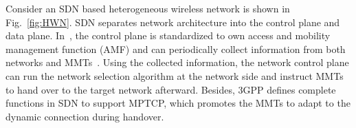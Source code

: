 \documentclass[conference]{IEEEtran}
\begin{document}
Consider an SDN based heterogeneous wireless network is shown in Fig.~\ref{fig:HWN}. SDN separates network architecture into the control plane and data plane.
In~\cite{3GPP}, the control plane is standardized to own access and mobility management function (AMF) and
can periodically collect information from both networks and MMTs~\cite{speedup}. Using the collected information, 
the network control plane can run the network selection algorithm at the network side and instruct MMTs to hand over to the target network afterward.
Besides, 3GPP defines complete functions in SDN to support MPTCP, which promotes the MMTs to adapt to the dynamic connection during handover.   
 
\end{document}
